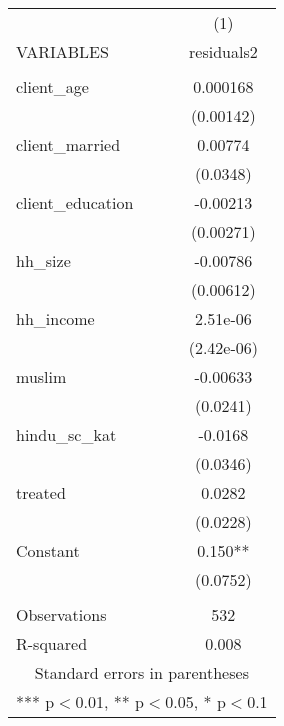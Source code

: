\begin{tabular}{lc} \hline
 & (1) \\
VARIABLES & residuals2 \\ \hline
 &  \\
client\_age & 0.000168 \\
 & (0.00142) \\
client\_married & 0.00774 \\
 & (0.0348) \\
client\_education & -0.00213 \\
 & (0.00271) \\
hh\_size & -0.00786 \\
 & (0.00612) \\
hh\_income & 2.51e-06 \\
 & (2.42e-06) \\
muslim & -0.00633 \\
 & (0.0241) \\
hindu\_sc\_kat & -0.0168 \\
 & (0.0346) \\
treated & 0.0282 \\
 & (0.0228) \\
Constant & 0.150** \\
 & (0.0752) \\
 &  \\
Observations & 532 \\
 R-squared & 0.008 \\ \hline
\multicolumn{2}{c}{ Standard errors in parentheses} \\
\multicolumn{2}{c}{ *** p$<$0.01, ** p$<$0.05, * p$<$0.1} \\
\end{tabular}
